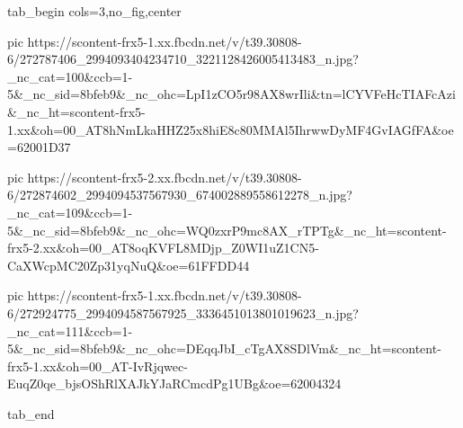  
 
 
 
 


\ifcmt
  tab_begin cols=3,no_fig,center

     pic https://scontent-frx5-1.xx.fbcdn.net/v/t39.30808-6/272787406_2994093404234710_3221128426005413483_n.jpg?_nc_cat=100&ccb=1-5&_nc_sid=8bfeb9&_nc_ohc=LpI1zCO5r98AX8wrIli&tn=lCYVFeHcTIAFcAzi&_nc_ht=scontent-frx5-1.xx&oh=00_AT8hNmLkaHHZ25x8hiE8c80MMAl5IhrwwDyMF4GvIAGfFA&oe=62001D37

     pic https://scontent-frx5-2.xx.fbcdn.net/v/t39.30808-6/272874602_2994094537567930_674002889558612278_n.jpg?_nc_cat=109&ccb=1-5&_nc_sid=8bfeb9&_nc_ohc=WQ0zxrP9mc8AX_rTPTg&_nc_ht=scontent-frx5-2.xx&oh=00_AT8oqKVFL8MDjp_Z0WI1uZ1CN5-CaXWcpMC20Zp31yqNuQ&oe=61FFDD44

     pic https://scontent-frx5-1.xx.fbcdn.net/v/t39.30808-6/272924775_2994094587567925_3336451013801019623_n.jpg?_nc_cat=111&ccb=1-5&_nc_sid=8bfeb9&_nc_ohc=DEqqJbI_cTgAX8SDlVm&_nc_ht=scontent-frx5-1.xx&oh=00_AT-IvRjqwec-EuqZ0qe_bjsOShRlXAJkYJaRCmcdPg1UBg&oe=62004324

  tab_end
\fi
